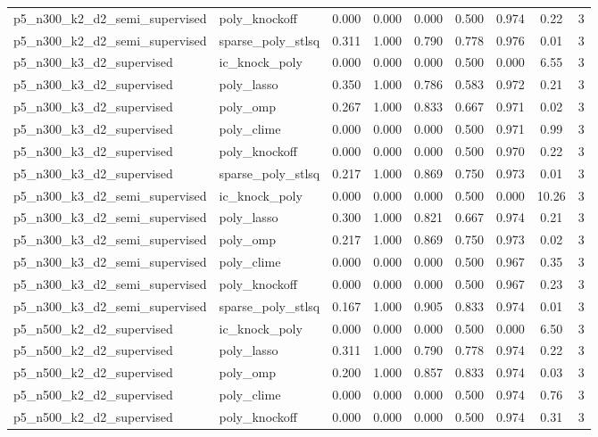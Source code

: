 \documentclass[12pt,a4paper]{article}
\begin{document}
\begin{table}[htbp]
{\begin{tabular}{llccccccc}
  p5\_n300\_k2\_d2\_semi\_supervised & poly\_knockoff & 0.000 & 0.000 & 0.000 & 0.500 & 0.974 & 0.22 & 3 \\
  p5\_n300\_k2\_d2\_semi\_supervised & sparse\_poly\_stlsq & 0.311 & 1.000 & 0.790 & 0.778 & 0.976 & 0.01 & 3 \\
  p5\_n300\_k3\_d2\_supervised & ic\_knock\_poly & 0.000 & 0.000 & 0.000 & 0.500 & 0.000 & 6.55 & 3 \\
  p5\_n300\_k3\_d2\_supervised & poly\_lasso & 0.350 & 1.000 & 0.786 & 0.583 & 0.972 & 0.21 & 3 \\
  p5\_n300\_k3\_d2\_supervised & poly\_omp & 0.267 & 1.000 & 0.833 & 0.667 & 0.971 & 0.02 & 3 \\
  p5\_n300\_k3\_d2\_supervised & poly\_clime & 0.000 & 0.000 & 0.000 & 0.500 & 0.971 & 0.99 & 3 \\
  p5\_n300\_k3\_d2\_supervised & poly\_knockoff & 0.000 & 0.000 & 0.000 & 0.500 & 0.970 & 0.22 & 3 \\
  p5\_n300\_k3\_d2\_supervised & sparse\_poly\_stlsq & 0.217 & 1.000 & 0.869 & 0.750 & 0.973 & 0.01 & 3 \\
  p5\_n300\_k3\_d2\_semi\_supervised & ic\_knock\_poly & 0.000 & 0.000 & 0.000 & 0.500 & 0.000 & 10.26 & 3 \\
  p5\_n300\_k3\_d2\_semi\_supervised & poly\_lasso & 0.300 & 1.000 & 0.821 & 0.667 & 0.974 & 0.21 & 3 \\
  p5\_n300\_k3\_d2\_semi\_supervised & poly\_omp & 0.217 & 1.000 & 0.869 & 0.750 & 0.973 & 0.02 & 3 \\
  p5\_n300\_k3\_d2\_semi\_supervised & poly\_clime & 0.000 & 0.000 & 0.000 & 0.500 & 0.967 & 0.35 & 3 \\
  p5\_n300\_k3\_d2\_semi\_supervised & poly\_knockoff & 0.000 & 0.000 & 0.000 & 0.500 & 0.967 & 0.23 & 3 \\
  p5\_n300\_k3\_d2\_semi\_supervised & sparse\_poly\_stlsq & 0.167 & 1.000 & 0.905 & 0.833 & 0.974 & 0.01 & 3 \\
  p5\_n500\_k2\_d2\_supervised & ic\_knock\_poly & 0.000 & 0.000 & 0.000 & 0.500 & 0.000 & 6.50 & 3 \\
  p5\_n500\_k2\_d2\_supervised & poly\_lasso & 0.311 & 1.000 & 0.790 & 0.778 & 0.974 & 0.22 & 3 \\
  p5\_n500\_k2\_d2\_supervised & poly\_omp & 0.200 & 1.000 & 0.857 & 0.833 & 0.974 & 0.03 & 3 \\
  p5\_n500\_k2\_d2\_supervised & poly\_clime & 0.000 & 0.000 & 0.000 & 0.500 & 0.974 & 0.76 & 3 \\
  p5\_n500\_k2\_d2\_supervised & poly\_knockoff & 0.000 & 0.000 & 0.000 & 0.500 & 0.974 & 0.31 & 3 \\

\end{tabular}}
\end{table}
\end{document}
